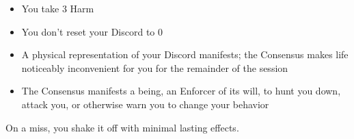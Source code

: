 \begin{multicols}{3}
\begin{move}
    \begin{itemize}
      \setlength\itemsep{0em}
    \item You take 3 Harm
    \item You don’t reset your Discord to 0
    \item A physical representation of your Discord manifests; the Consensus makes life noticeably inconvenient for you for the remainder of the session
    \item The Consensus manifests a being, an Enforcer of its will, to hunt you down, attack you, or otherwise warn you to change your behavior 
    \end{itemize}
On a miss, you shake it off with minimal lasting effects.

  \end{move}

\end{multicols}
